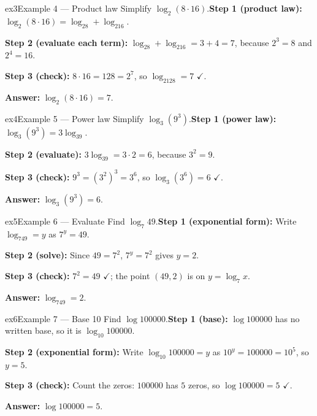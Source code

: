 \documentclass[11pt]{article}
\begin{document}
\begin{example}{ex3}{Example 4 --- Product law}
Simplify $\log_2(8\cdot16)$.\soln \textbf{Step 1 (product law):} $\log_2(8\cdot16)=\log_28+\log_216$.

\textbf{Step 2 (evaluate each term):} $\log_28+\log_216=3+4=7$, because $2^3=8$ and $2^4=16$.

\textbf{Step 3 (check):} $8\cdot16=128=2^7$, so $\log_2128=7$ $\checkmark$.

\textbf{Answer:} $\log_2(8\cdot16)=7$.

\end{example}

\begin{example}{ex4}{Example 5 --- Power law}
Simplify $\log_3(9^3)$.\soln \textbf{Step 1 (power law):} $\log_3(9^3)=3\log_39$.

\textbf{Step 2 (evaluate):} $3\log_39=3\cdot2=6$, because $3^2=9$.

\textbf{Step 3 (check):} $9^3=(3^2)^3=3^6$, so $\log_3(3^6)=6$ $\checkmark$.

\textbf{Answer:} $\log_3(9^3)=6$.
\end{example}

\begin{example}{ex5}{Example 6 --- Evaluate}
Find $\log_7 49$.\soln \textbf{Step 1 (exponential form):} Write $\log_749=y$ as $7^y=49$.

\textbf{Step 2 (solve):} Since $49=7^2$, $7^y=7^2$ gives $y=2$.

\textbf{Step 3 (check):} $7^2=49$ $\checkmark$; the point $(49,2)$ is on $y=\log_7x$.

\textbf{Answer:} $\log_749=2$.

\end{example}

\begin{example}{ex6}{Example 7 --- Base 10}
Find $\log 100000$.\soln \textbf{Step 1 (base):} $\log100000$ has no written base, so it is $\log_{10}100000$.

\textbf{Step 2 (exponential form):} Write $\log_{10}100000=y$ as $10^y=100000=10^5$, so $y=5$.

\textbf{Step 3 (check):} Count the zeros: $100000$ has $5$ zeros, so $\log100000=5$ $\checkmark$.

\textbf{Answer:} $\log100000=5$.
\end{example}
\end{document}
